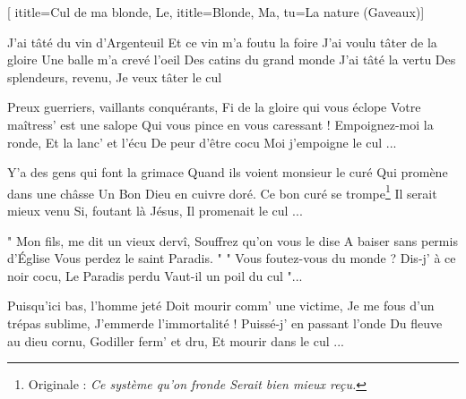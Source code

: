 [
  ititle={Cul de ma blonde, Le},
  ititle={Blonde, Ma},
  tu={La nature (Gaveaux)}]

  
\beginverse
J'ai tâté du vin d'Argenteuil
Et ce vin m'a foutu la foire
J'ai voulu tâter de la gloire
Une balle m'a crevé l'oeil
Des catins du grand monde
J'ai tâté la vertu
Des splendeurs, revenu,
Je veux tâter le cul
\endverse

\beginverse
Preux guerriers, vaillants conquérants,
Fi de la gloire qui vous éclope
Votre maîtress' est une salope
Qui vous pince en vous caressant !
Empoignez-moi la ronde,
Et la lanc' et l'écu
De peur d'être cocu
Moi j'empoigne le cul ...
\endverse

\beginverse
Y'a des gens qui font la grimace
Quand ils voient monsieur le curé
Qui promène dans une châsse
Un Bon Dieu en cuivre doré.
Ce bon curé se trompe\footnote{Originale : \emph{Ce système qu'on fronde Serait bien mieux reçu.}}
Il serait mieux venu
Si, foutant là Jésus,
Il promenait le cul ...
\endverse

\beginverse
" Mon fils, me dit un vieux dervî,
Souffrez qu'on vous le dise
A baiser sans permis d'Église
Vous perdez le saint Paradis. "
" Vous foutez-vous du monde ?
Dis-j' à ce noir cocu,
Le Paradis perdu
Vaut-il un poil du cul "...
\endverse

\beginverse
Puisqu'ici bas, l'homme jeté
Doit mourir comm' une victime,
Je me fous d'un trépas sublime,
J'emmerde l'immortalité !
Puissé-j' en passant l'onde
Du fleuve au dieu cornu,
Godiller ferm' et dru,
Et mourir dans le cul ...
\endverse

\endsong
